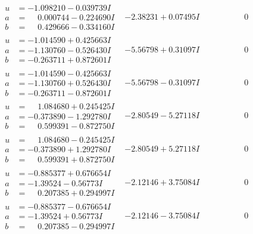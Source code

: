 \documentclass[1p]{elsarticle_modified}
\theoremstyle{definition}
\begin{document}
$$\begin{array}{c|c|c}
\begin{aligned}
u &= -1.098210 - 0.039739 I \\
a &= \phantom{-}0.000744 - 0.224690 I \\
b &= \phantom{-}0.429666 - 0.334160 I\end{aligned}
 & -2.38231 + 0.07495 I & \phantom{-0.000000 } 0 \\ \hline\begin{aligned}
u &= -1.014590 + 0.425663 I \\
a &= -1.130760 - 0.526430 I \\
b &= -0.263711 + 0.872601 I\end{aligned}
 & -5.56798 + 0.31097 I & \phantom{-0.000000 } 0 \\ \hline\begin{aligned}
u &= -1.014590 - 0.425663 I \\
a &= -1.130760 + 0.526430 I \\
b &= -0.263711 - 0.872601 I\end{aligned}
 & -5.56798 - 0.31097 I & \phantom{-0.000000 } 0 \\ \hline\begin{aligned}
u &= \phantom{-}1.084680 + 0.245425 I \\
a &= -0.373890 - 1.292780 I \\
b &= \phantom{-}0.599391 - 0.872750 I\end{aligned}
 & -2.80549 - 5.27118 I & \phantom{-0.000000 } 0 \\ \hline\begin{aligned}
u &= \phantom{-}1.084680 - 0.245425 I \\
a &= -0.373890 + 1.292780 I \\
b &= \phantom{-}0.599391 + 0.872750 I\end{aligned}
 & -2.80549 + 5.27118 I & \phantom{-0.000000 } 0 \\ \hline\begin{aligned}
u &= -0.885377 + 0.676654 I \\
a &= -1.39524 - 0.56773 I \\
b &= \phantom{-}0.207385 + 0.294997 I\end{aligned}
 & -2.12146 + 3.75084 I & \phantom{-0.000000 } 0 \\ \hline\begin{aligned}
u &= -0.885377 - 0.676654 I \\
a &= -1.39524 + 0.56773 I \\
b &= \phantom{-}0.207385 - 0.294997 I\end{aligned}
 & -2.12146 - 3.75084 I & \phantom{-0.000000 } 0\\

\end{array}$$
\end{document}
